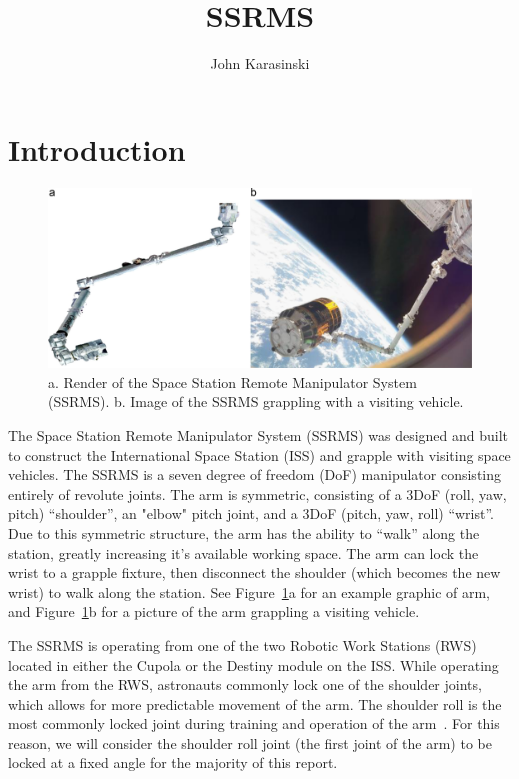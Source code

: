 \documentclass{article}
\author{John Karasinski}
\title{SSRMS}
\begin{document}
\maketitle
\tableofcontents
\clearpage

\section{Introduction}

\begin{figure}[b]
\includegraphics[width=\textwidth]{ssrms.jpg}
\caption{a. Render of the Space Station Remote Manipulator System (SSRMS). b. Image of the SSRMS grappling with a visiting vehicle.}
\label{ssrms_image}
\end{figure}

The Space Station Remote Manipulator System (SSRMS) was designed and built to construct the International Space Station (ISS) and grapple with visiting space vehicles.
The SSRMS is a seven degree of freedom (DoF) manipulator consisting entirely of revolute joints.
The arm is symmetric, consisting of a 3DoF (roll, yaw, pitch) ``shoulder'', an "elbow" pitch joint, and a 3DoF (pitch, yaw, roll) ``wrist''.
Due to this symmetric structure, the arm has the ability to ``walk'' along the station, greatly increasing it's available working space.
The arm can lock the wrist to a grapple fixture, then disconnect the shoulder (which becomes the new wrist) to walk along the station.
See Figure~\ref{ssrms_image}a for an example graphic of arm, and Figure~\ref{ssrms_image}b for a picture of the arm grappling a visiting vehicle.

The SSRMS is operating from one of the two Robotic Work Stations (RWS) located in either the Cupola or the Destiny module on the ISS.
While operating the arm from the RWS, astronauts commonly lock one of the shoulder joints, which allows for more predictable movement of the arm.
The shoulder roll is the most commonly locked joint during training and operation of the arm~\cite{astro_emails}.
For this reason, we will consider the shoulder roll joint (the first joint of the arm) to be locked at a fixed angle for the majority of this report.
\end{document}
